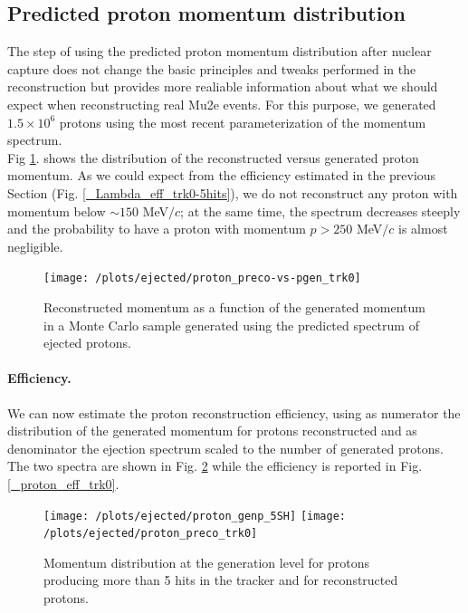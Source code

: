\documentclass[12pt,a4paper,openright, oneside, titlepage]{book} %
\begin{document}
\subsection{Predicted proton momentum distribution}
The step of using the predicted proton momentum distribution after nuclear capture
does not change the basic principles 
and tweaks performed in the reconstruction but provides more realiable information 
about what we should expect when reconstructing real Mu2e events. 
For this purpose, we generated $1.5\times10^6$ protons using 
the most recent parameterization of the momentum spectrum.\\
Fig \ref{_proton_preco-vs-pgen_trk0}. shows
the distribution of the reconstructed versus generated proton momentum. 
As we could expect from the efficiency estimated in the previous Section (Fig. \ref{_Lambda_eff_trk0-5hits}), 
we do not reconstruct any proton with momentum below $\sim 150$ MeV$/c$; 
at the same time, the spectrum decreases steeply and the probability to have 
a proton with momentum $p > 250$ MeV$/c$ is almost negligible.

\begin{figure}[!htb]
\centering
\texttt{[image: /plots/ejected/proton\_preco-vs-pgen\_trk0]}
\caption[Reconstructed vs generated momentum (ejected protons)]
{Reconstructed momentum as a function of the generated momentum 
in a Monte Carlo sample generated
using the predicted spectrum of ejected protons.}
\label{_proton_preco-vs-pgen_trk0}
\end{figure}

\paragraph{Efficiency.} We can now estimate the proton reconstruction efficiency, 
using as numerator the distribution of the generated momentum for protons reconstructed 
and as denominator the ejection spectrum scaled to the number of generated protons. 
The two spectra are shown in Fig. \ref{_proton_momenta} while the efficiency is reported in Fig. \ref{_proton_eff_trk0}.

\begin{figure}[h!]
\centering
\texttt{[image: /plots/ejected/proton\_genp\_5SH]}\hfill
\texttt{[image: /plots/ejected/proton\_preco\_trk0]}
\caption[Momentum distributions for generated particles with more then 5 StrawHits and reconstructed particles]{Momentum distribution at the generation level for protons producing more than 5 hits in the tracker 
and for reconstructed protons.}
\label{_proton_momenta}
\end{figure}
\end{document}
